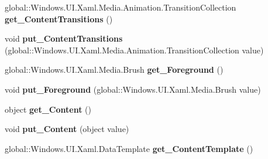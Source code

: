 \begin{DoxyCompactItemize}
\item 
\mbox{\label{interface_windows_1_1_u_i_1_1_xaml_1_1_controls_1_1_i_content_presenter_a0db45f8a30518615e50e4f98e8bcc040}} 
global\+::\+Windows.\+U\+I.\+Xaml.\+Media.\+Animation.\+Transition\+Collection {\bfseries get\+\_\+\+Content\+Transitions} ()
\item 
\mbox{\label{interface_windows_1_1_u_i_1_1_xaml_1_1_controls_1_1_i_content_presenter_af8f3017b639541ee85c82042f3186506}} 
void {\bfseries put\+\_\+\+Content\+Transitions} (global\+::\+Windows.\+U\+I.\+Xaml.\+Media.\+Animation.\+Transition\+Collection value)
\item 
\mbox{\label{interface_windows_1_1_u_i_1_1_xaml_1_1_controls_1_1_i_content_presenter_a95c7018f0564a23c7ab641c21ab2cf47}} 
global\+::\+Windows.\+U\+I.\+Xaml.\+Media.\+Brush {\bfseries get\+\_\+\+Foreground} ()
\item 
\mbox{\label{interface_windows_1_1_u_i_1_1_xaml_1_1_controls_1_1_i_content_presenter_a77229ce3c46ba5f9ecb3fbe3361e9c0a}} 
void {\bfseries put\+\_\+\+Foreground} (global\+::\+Windows.\+U\+I.\+Xaml.\+Media.\+Brush value)
\item 
\mbox{\label{interface_windows_1_1_u_i_1_1_xaml_1_1_controls_1_1_i_content_presenter_ae239eb9dcb8ffce9b1af514ec96d232c}} 
object {\bfseries get\+\_\+\+Content} ()
\item 
\mbox{\label{interface_windows_1_1_u_i_1_1_xaml_1_1_controls_1_1_i_content_presenter_a92a8239bd5d9c2deaf3a6901d4c33da6}} 
void {\bfseries put\+\_\+\+Content} (object value)
\item 
\mbox{\label{interface_windows_1_1_u_i_1_1_xaml_1_1_controls_1_1_i_content_presenter_a5ba47cb8cb89765bea45f2242ad31a45}} 
global\+::\+Windows.\+U\+I.\+Xaml.\+Data\+Template {\bfseries get\+\_\+\+Content\+Template} ()

\end{DoxyCompactItemize}
